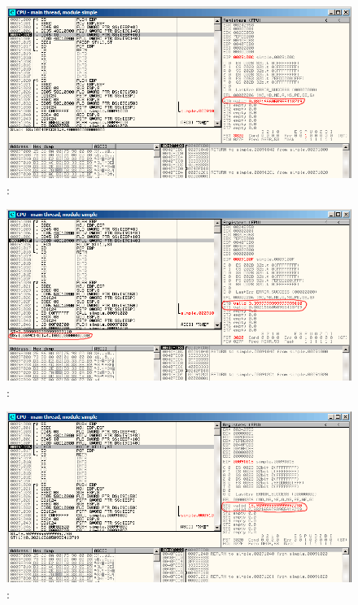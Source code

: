 \begin{figure}[H]
\centering
\includegraphics[scale=\FigScale]{patterns/12_FPU/1_simple/olly2.png}
\caption{\olly: \FDIV {}}
\label{fig:FPU_simple_olly_2}
\end{figure}

\begin{figure}[H]
\centering
\includegraphics[scale=\FigScale]{patterns/12_FPU/1_simple/olly3.png}
\caption{\olly: }
\label{fig:FPU_simple_olly_3}
\end{figure}

\begin{figure}[H]
\centering
\includegraphics[scale=\FigScale]{patterns/12_FPU/1_simple/olly4.png}
\caption{\olly: \FMUL {}}
\label{fig:FPU_simple_olly_4}
\end{figure}


